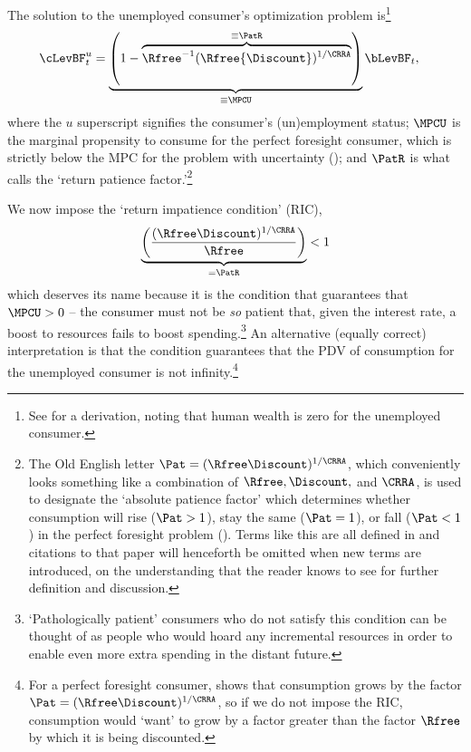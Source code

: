 \documentclass{\handout}
\begin{document}
The solution to the unemployed consumer's optimization problem
is\footnote{See  for a derivation, noting that human wealth is zero for the unemployed consumer.} 
\begin{equation}\begin{gathered}\begin{aligned}
        \cLevBF^{u}_{t} & =  \underbrace{\left(1-\overbrace{\Rfree ^{-1}(\Rfree{\Discount})^{1/\CRRA}}^{\equiv \PatR}\right)}_{\equiv \MPCU} \bLevBF_{t} \label{eq:cpfinfhorunemp} %
,
\end{aligned}\end{gathered}\end{equation}
where the $u$ superscript signifies the consumer's (un)employment
status; $\MPCU$ is the marginal propensity to consume for the perfect
foresight consumer, which is strictly below the MPC for the problem
with uncertainty (\cite{carroll&kimball:concavity}); and $\PatR$ is
what \cite{BufferStockTheory} calls the `return patience factor.'\footnote{The Old English letter $\Pat = (\Rfree \Discount)^{1/\CRRA}$, which conveniently looks something like a combination of $\Rfree, \Discount, $ and $\CRRA$, is used to designate the `absolute patience factor' which determines whether consumption will rise ($\Pat > 1$), stay the same ($\Pat = 1$), or fall ($\Pat < 1$) in the perfect foresight problem ().  Terms like this are all defined in \cite{carrollBSTheory} and citations to that paper will henceforth be omitted when new terms are introduced, on the understanding that the reader knows to see \cite{carrollBSTheory} for further definition and discussion.}


\indent We now impose the `return impatience condition' (RIC),
\begin{equation}\begin{gathered}\begin{aligned}
  \underbrace{\left(\frac{(\Rfree \Discount)^{1/\CRRA}}{\Rfree}\right)}_{= \PatR} < 1 \label{eq:RIC}
\end{aligned}\end{gathered}\end{equation}
which deserves its name because it is the condition that guarantees that $\MPCU
> 0$ -- the consumer must not be {\it so} patient that, given the interest rate, a boost to
resources fails to boost spending.\footnote{`Pathologically patient' consumers who do not satisfy this condition can be thought of as people who would hoard any incremental resources in order to enable even more extra spending in the distant future.}
An alternative (equally correct)
interpretation is that the condition guarantees that the PDV of
consumption for the unemployed consumer is not infinity.\footnote{For a perfect
foresight consumer,  shows that consumption grows by the factor
$\Pat = (\Rfree\Discount)^{1/\CRRA}$, so if we do not impose the RIC, consumption would `want' to grow by
a factor greater than the factor $\Rfree$ by which it is being
discounted.}  
\end{document}
